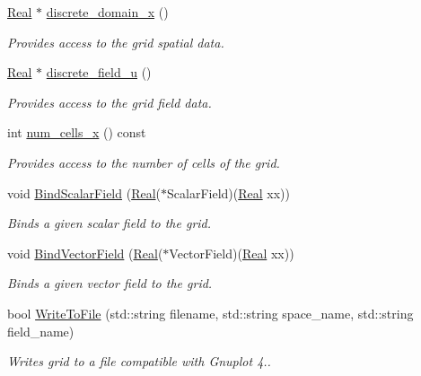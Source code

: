 \begin{DoxyCompactItemize}
\hyperlink{group__c01-roots_gac080bbbf5cbb5502c9f00405f894857d}{Real} $\ast$ \hyperlink{classmtk_1_1UniStgGrid1D_a858a63163d7f324ee2c79b1bed51402f}{discrete\-\_\-domain\-\_\-x} ()
\begin{DoxyCompactList}\small\item\em Provides access to the grid spatial data. \end{DoxyCompactList}\item 
\hyperlink{group__c01-roots_gac080bbbf5cbb5502c9f00405f894857d}{Real} $\ast$ \hyperlink{classmtk_1_1UniStgGrid1D_acf28d702f6e702599986afcb253bbfc1}{discrete\-\_\-field\-\_\-u} ()
\begin{DoxyCompactList}\small\item\em Provides access to the grid field data. \end{DoxyCompactList}\item 
int \hyperlink{classmtk_1_1UniStgGrid1D_af1b3729d8afa07be5b2775ed68015b80}{num\-\_\-cells\-\_\-x} () const 
\begin{DoxyCompactList}\small\item\em Provides access to the number of cells of the grid. \end{DoxyCompactList}\item 
void \hyperlink{classmtk_1_1UniStgGrid1D_a438cda229830d0e2f35c615e70b59a76}{Bind\-Scalar\-Field} (\hyperlink{group__c01-roots_gac080bbbf5cbb5502c9f00405f894857d}{Real}($\ast$Scalar\-Field)(\hyperlink{group__c01-roots_gac080bbbf5cbb5502c9f00405f894857d}{Real} xx))
\begin{DoxyCompactList}\small\item\em Binds a given scalar field to the grid. \end{DoxyCompactList}\item 
void \hyperlink{classmtk_1_1UniStgGrid1D_a5703f1f875f52f6de8f7db5a6250fafa}{Bind\-Vector\-Field} (\hyperlink{group__c01-roots_gac080bbbf5cbb5502c9f00405f894857d}{Real}($\ast$Vector\-Field)(\hyperlink{group__c01-roots_gac080bbbf5cbb5502c9f00405f894857d}{Real} xx))
\begin{DoxyCompactList}\small\item\em Binds a given vector field to the grid. \end{DoxyCompactList}\item 
bool \hyperlink{classmtk_1_1UniStgGrid1D_aec52d35ba7edc062ae4e8848ef1336ff}{Write\-To\-File} (std\-::string filename, std\-::string space\-\_\-name, std\-::string field\-\_\-name)
\begin{DoxyCompactList}\small\item\em Writes grid to a file compatible with Gnuplot 4.. \end{DoxyCompactList}\end{DoxyCompactItemize}
